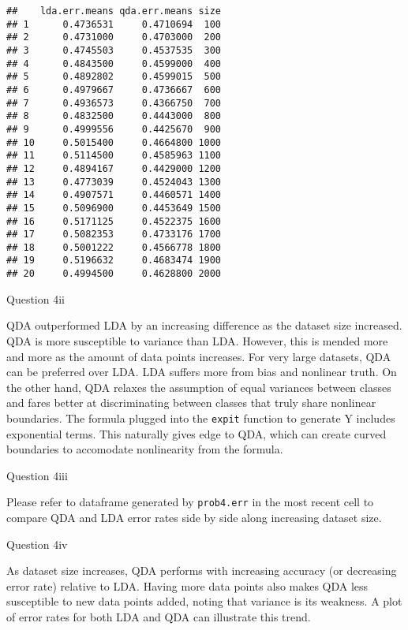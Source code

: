 \documentclass[
]{article}
\begin{document}
\begin{verbatim}
##    lda.err.means qda.err.means size
## 1      0.4736531     0.4710694  100
## 2      0.4731000     0.4703000  200
## 3      0.4745503     0.4537535  300
## 4      0.4843500     0.4599000  400
## 5      0.4892802     0.4599015  500
## 6      0.4979667     0.4736667  600
## 7      0.4936573     0.4366750  700
## 8      0.4832500     0.4443000  800
## 9      0.4999556     0.4425670  900
## 10     0.5015400     0.4664800 1000
## 11     0.5114500     0.4585963 1100
## 12     0.4894167     0.4429000 1200
## 13     0.4773039     0.4524043 1300
## 14     0.4907571     0.4460571 1400
## 15     0.5096900     0.4453649 1500
## 16     0.5171125     0.4522375 1600
## 17     0.5082353     0.4733176 1700
## 18     0.5001222     0.4566778 1800
## 19     0.5196632     0.4683474 1900
## 20     0.4994500     0.4628800 2000
\end{verbatim}

Question 4ii

QDA outperformed LDA by an increasing difference as the dataset size
increased. QDA is more susceptible to variance than LDA. However, this
is mended more and more as the amount of data points increases. For very
large datasets, QDA can be preferred over LDA. LDA suffers more from
bias and nonlinear truth. On the other hand, QDA relaxes the assumption
of equal variances between classes and fares better at discriminating
between classes that truly share nonlinear boundaries. The formula
plugged into the \texttt{expit} function to generate Y includes
exponential terms. This naturally gives edge to QDA, which can create
curved boundaries to accomodate nonlinearity from the formula.

Question 4iii

Please refer to dataframe generated by \texttt{prob4.err} in the most
recent cell to compare QDA and LDA error rates side by side along
increasing dataset size.

Question 4iv

As dataset size increases, QDA performs with increasing accuracy (or
decreasing error rate) relative to LDA. Having more data points also
makes QDA less susceptible to new data points added, noting that
variance is its weakness. A plot of error rates for both LDA and QDA can
illustrate this trend.
\end{document}
